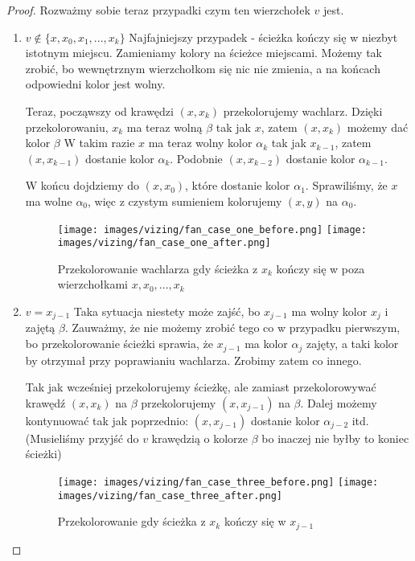 \begin{proof}
        Rozważmy sobie teraz przypadki czym ten wierzchołek $v$ jest.
        
        \begin{enumerate}
            \item $v \notin \{x, x_0, x_1, ..., x_k\}$ 
            Najfajniejszy przypadek - ścieżka kończy się w niezbyt istotnym miejscu. Zamieniamy kolory na ścieżce miejscami. Możemy tak zrobić, bo wewnętrznym wierzchołkom się nic nie zmienia, a na końcach odpowiedni kolor jest wolny.
            
            Teraz, począwszy od krawędzi $(x, x_k)$ przekolorujemy wachlarz. 
            Dzięki przekolorowaniu, $x_k$ ma teraz wolną $\beta$ tak jak $x$, zatem $(x, x_k)$ możemy dać kolor $\beta$ 
            W takim razie $x$ ma teraz wolny kolor $\alpha_k$ tak jak $x_{k - 1}$, 
            zatem $(x, x_{k-1})$ dostanie kolor $\alpha_k$.
            Podobnie $(x, x_{k-2})$ dostanie kolor $\alpha_{k-1}$.
            
            W końcu dojdziemy do $(x, x_0)$, które dostanie kolor $\alpha_1$. Sprawiliśmy, że $x$ ma wolne $\alpha_0$,
            więc z czystym sumieniem kolorujemy $(x, y)$ na $\alpha_0$. 
            
            \begin{figure}[H]
                \centering
                \texttt{[image: images/vizing/fan\_case\_one\_before.png]}
                \texttt{[image: images/vizing/fan\_case\_one\_after.png]}
                \caption{Przekolorowanie wachlarza gdy ścieżka z $x_k$ kończy się w poza wierzchołkami $x, x_0, ..., x_k$}
            \end{figure}
            
            \item $v = x_{j - 1}$ 
            Taka sytuacja niestety może zajść, bo $x_{j-1}$ ma wolny kolor $x_j$ i zajętą $\beta$.
            Zauważmy, że nie możemy zrobić tego co w przypadku pierwszym, bo przekolorowanie ścieżki sprawia, że $x_{j-1}$ ma kolor $\alpha_j$ zajęty, a taki kolor by otrzymał przy poprawianiu wachlarza. Zrobimy zatem co innego.
            
            Tak jak wcześniej przekolorujemy ścieżkę,
            ale zamiast przekolorowywać krawędź $(x, x_k)$ na $\beta$
            przekolorujemy $(x, x_{j-1})$ na $\beta$. 
            Dalej możemy kontynuować tak jak poprzednio: $(x, x_{j-1})$ dostanie kolor $\alpha_{j-2}$ itd. (Musieliśmy przyjść do \(v\) krawędzią o kolorze \(\beta\) bo inaczej nie byłby to koniec ścieżki)
            
            
            \begin{figure}[H]
                \centering
                \texttt{[image: images/vizing/fan\_case\_three\_before.png]}
                \texttt{[image: images/vizing/fan\_case\_three\_after.png]}
                \caption{Przekolorowanie gdy ścieżka z $x_k$ kończy się w $x_{j-1}$}
            \end{figure}
            
        \end{enumerate}
        
        
        
    \end{proof}